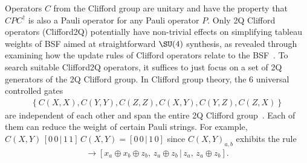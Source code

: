 Operators $C$ from the Clifford group are unitary and have the property that $CPC^\dagger$ is also a Pauli operator for any Pauli operator $P$. %
Only 2Q Clifford operators (Clifford2Q) potentially have non-trivial effects on simplifying tableau weights of BSF aimed at straightforward $\SU(4)$ synthesis, as revealed through examining how the update rules of Clifford operators relate to the BSF~\cite{van2020circuit}.
To search suitable Clifford2Q operators, it suffices to just focus on a set of 2Q generators of the 2Q Clifford group. In Clifford group theory, the 6 universal controlled gates 
\begin{align*}
    \left\{ C(X,X), C(Y,Y), C(Z,Z), C(X,Y), C(Y,Z), C(Z,X) \right\}
\end{align*}
are independent of each other and span the entire 2Q Clifford group~\cite{grier2022classification}. Each of them can reduce the weight of certain Pauli strings. For example, $C(X,Y)\, [0\, 0\, |\, 1\, 1] \,C(X,Y) = [0\, 0\, |\, 1\, 0] $ since $C(X,Y)_{a,b}$ exhibits the rule
\begin{align*}
[x_a,\, x_b\, |\, z_a,\, z_b] \rightarrow [x_a\oplus x_b\oplus z_b,\, z_a\oplus z_b\, |\, z_a,\, z_a\oplus z_b].
\end{align*}




